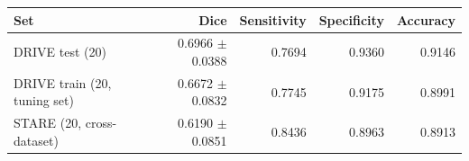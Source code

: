 \begin{tabular}{lrrrr}
\toprule
Set & Dice & Sensitivity & Specificity & Accuracy \\
\midrule
DRIVE test (20) & 0.6966 $\pm$ 0.0388 & 0.7694 & 0.9360 & 0.9146 \\
DRIVE train (20, tuning set) & 0.6672 $\pm$ 0.0832 & 0.7745 & 0.9175 & 0.8991 \\
STARE (20, cross-dataset) & 0.6190 $\pm$ 0.0851 & 0.8436 & 0.8963 & 0.8913 \\
\bottomrule
\end{tabular}
